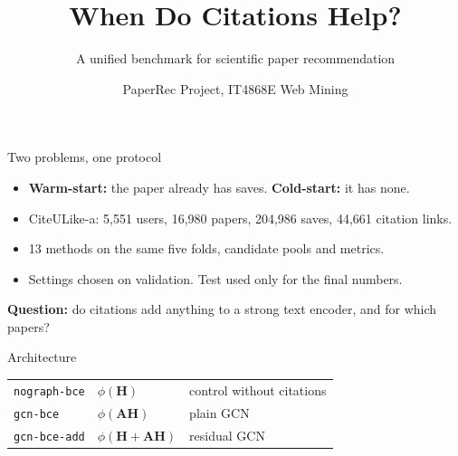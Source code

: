 \documentclass[10pt,aspectratio=169]{beamer}
\title{When Do Citations Help?}
\subtitle{A unified benchmark for scientific paper recommendation}
\author{PaperRec Project, IT4868E Web Mining}
\date{}
\begin{document}
\begin{frame}\titlepage\end{frame}

\begin{frame}{Two problems, one protocol}
\begin{itemize}\setlength\itemsep{3mm}
\item \textbf{Warm-start:} the paper already has saves. \textbf{Cold-start:} it has none.
\item CiteULike-a: 5,551 users, 16,980 papers, 204,986 saves, 44,661 citation links.
\item 13 methods on the same five folds, candidate pools and metrics.
\item Settings chosen on validation. Test used only for the final numbers.
\end{itemize}
\vspace{4mm}
\textbf{Question:} do citations add anything to a strong text encoder, and for which papers?
\end{frame}

\begin{frame}{Architecture}
\centering
{}

\vspace{6mm}
\begin{tabular}{lll}
\texttt{nograph-bce} & $\phi(\mathbf{H})$ & control without citations\\
\texttt{gcn-bce} & $\phi(\mathbf{A}\mathbf{H})$ & plain GCN\\
\texttt{gcn-bce-add} & $\phi(\mathbf{H}+\mathbf{A}\mathbf{H})$ & residual GCN\\
\end{tabular}
\end{frame}
\end{document}
